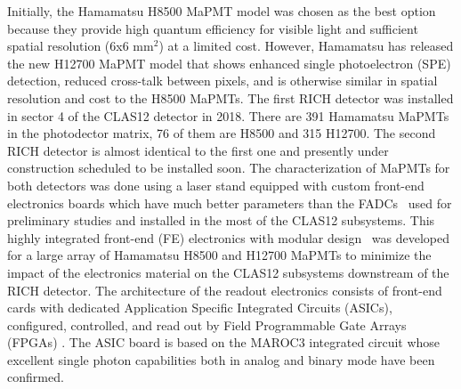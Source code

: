 Initially, the Hamamatsu H8500 MaPMT model \cite{H8500} was chosen as the best option because they provide high quantum efficiency for visible light and sufficient spatial resolution (6x6 mm$^2$) at a limited cost.
However, Hamamatsu has released the new H12700 MaPMT model  \cite{H12700} that shows enhanced single photoelectron (SPE) detection, reduced cross-talk between pixels, and is otherwise similar in spatial resolution and  cost to the H8500 MaPMTs.
The first RICH detector was installed in sector 4 of the CLAS12 detector in 2018.
There are 391 Hamamatsu MaPMTs  in the photodector matrix, 76 of them are H8500 and 315 H12700. 
The second RICH detector is almost identical to the first one and presently under construction scheduled to be installed soon.
The characterization of MaPMTs for both detectors was done using a laser stand equipped with custom front-end electronics boards which have much better parameters than the FADCs~\cite{FADC250} used for preliminary studies and installed in the most of the CLAS12 subsystems.
This highly integrated front-end (FE) electronics with modular design~\cite{RICH_FE} was developed for a large array of Hamamatsu H8500 and H12700 MaPMTs to minimize the impact of the electronics material on the CLAS12 subsystems downstream of the RICH detector.
The architecture of the readout electronics consists of front-end cards with dedicated Application Specific Integrated Circuits (ASICs), configured, controlled, and read out by Field Programmable Gate Arrays (FPGAs) \cite{RICH_FE}.
The ASIC board is based on the MAROC3  integrated circuit \cite{MAROC} whose excellent single photon capabilities both in analog and binary mode have been confirmed.
